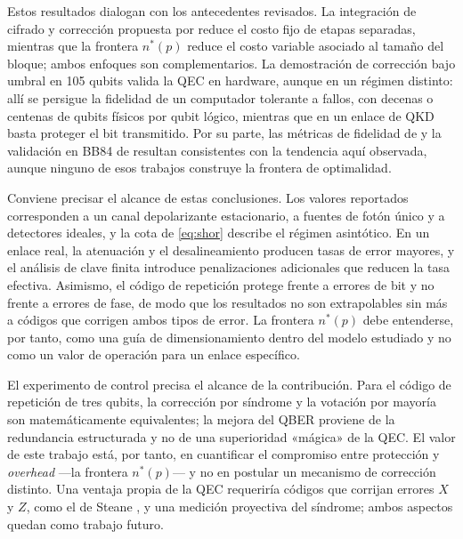\documentclass[conference]{IEEEtran}
\begin{document}
Estos resultados dialogan con los antecedentes revisados. La integración de
cifrado y corrección propuesta por \cite{jha2024} reduce el costo fijo de etapas
separadas, mientras que la frontera $n^{*}(p)$ reduce el costo variable asociado
al tamaño del bloque; ambos enfoques son complementarios. La demostración de
corrección bajo umbral en 105 qubits \cite{acharya2025} valida la QEC en
hardware, aunque en un régimen distinto: allí se persigue la fidelidad de un
computador tolerante a fallos, con decenas o centenas de qubits físicos por qubit
lógico, mientras que en un enlace de QKD basta proteger el bit transmitido. Por
su parte, las métricas de fidelidad de \cite{zheng2024} y la validación en BB84 de
\cite{jayachandran2025} resultan consistentes con la tendencia aquí observada,
aunque ninguno de esos trabajos construye la frontera de optimalidad.

Conviene precisar el alcance de estas conclusiones. Los valores reportados
corresponden a un canal depolarizante estacionario, a fuentes de fotón único y a
detectores ideales, y la cota de \eqref{eq:shor} describe el régimen asintótico.
En un enlace real, la atenuación y el desalineamiento producen tasas de error
mayores, y el análisis de clave finita introduce penalizaciones adicionales que
reducen la tasa efectiva. Asimismo, el código de repetición protege frente a
errores de bit y no frente a errores de fase, de modo que los resultados no son
extrapolables sin más a códigos que corrigen ambos tipos de error. La frontera
$n^{*}(p)$ debe entenderse, por tanto, como una guía de dimensionamiento dentro
del modelo estudiado y no como un valor de operación para un enlace específico.

El experimento de control precisa el alcance de la contribución. Para el código
de repetición de tres qubits, la corrección por síndrome y la votación por
mayoría son matemáticamente equivalentes; la mejora del QBER proviene de la
redundancia estructurada y no de una superioridad «mágica» de la QEC. El valor de
este trabajo está, por tanto, en cuantificar el compromiso entre protección y
\textit{overhead} —la frontera \(n^{*}(p)\)— y no en postular un mecanismo de
corrección distinto. Una ventaja propia de la QEC requeriría códigos que corrijan
errores \(X\) y \(Z\), como el de Steane \cite{steane1996}, y una medición
proyectiva del síndrome; ambos aspectos quedan como trabajo futuro.

\end{document}
